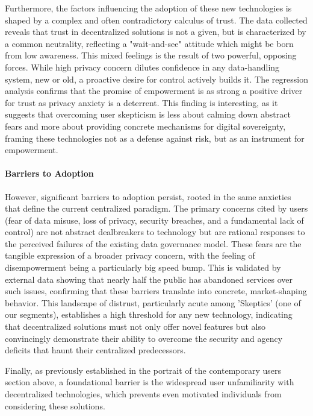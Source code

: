 	Furthermore, the factors influencing the adoption of these new technologies is shaped by a complex and often contradictory calculus of trust. The data collected reveals that trust in decentralized solutions is not a given, but is characterized by a common neutrality, reflecting a "wait-and-see" attitude which might be born from low awareness. This mixed feelings is the result of two powerful, opposing forces. While high privacy concern dilutes confidence in any data-handling system, new or old, a proactive desire for control actively builds it. The regression analysis confirms that the promise of empowerment is as strong a positive driver for trust as privacy anxiety is a deterrent. This finding is interesting, as it suggests that overcoming user skepticism is less about calming down abstract fears and more about providing concrete mechanisms for digital sovereignty, framing these technologies not as a defense against risk, but as an instrument for empowerment.

	\paragraph{Barriers to Adoption}
	However, significant barriers to adoption persist, rooted in the same anxieties that define the current centralized paradigm. The primary concerns cited by users (fear of data misuse, loss of privacy, security breaches, and a fundamental lack of control) are not abstract dealbreakers to technology but are rational responses to the perceived failures of the existing data governance model. These fears are the tangible expression of a broader privacy concern, with the feeling of disempowerment being a particularly big speed bump. This is validated by external data showing that nearly half the public has abandoned services over such issues, confirming that these barriers translate into concrete, market-shaping behavior. This landscape of distrust, particularly acute among 'Skeptics' (one of our segments), establishes a high threshold for any new technology, indicating that decentralized solutions must not only offer novel features but also convincingly demonstrate their ability to overcome the security and agency deficits that haunt their centralized predecessors.

	Finally, as previously established in the portrait of the contemporary users section above, a foundational barrier is the widespread user unfamiliarity with decentralized technologies, which prevents even motivated individuals from considering these solutions.
